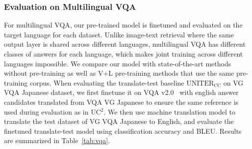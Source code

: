 \documentclass[final]{cvpr}
\begin{document}
\subsubsection{Evaluation on Multilingual VQA}
For multilingual VQA, our pre-trained model is finetuned and evaluated on the target language for each dataset. Unlike image-text retrieval where the same output layer is shared across different languages, multilingual VQA has different classes of answers for each language, which makes joint training across different languages impossible. We compare our model with state-of-the-art methods without pre-training as well as V+L pre-training methods that use the same pre-training corpus. When evaluating the translate-test baseline $\text{UNITER}_{\text{CC}}$ on VG VQA Japanese dataset, we first finetune it on VQA v2.0~\cite{vqa_v2} with english answer candidates translated from VQA VG Japanese to ensure the same reference is used during evaluation as in UC$^2$. We then use machine translation model to translate the test dataset of VG VQA Japanese to English, and evaluate the finetuned translate-test model using classification accuracy and BLEU. Results are summarized in Table~\ref{tab:vqa}.
\end{document}
